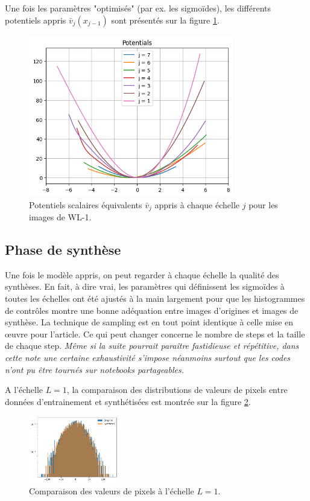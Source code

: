 \documentclass[12pt,twoside]{article}
\begin{document}
Une fois les paramètres "optimisés" (par ex. les sigmoïdes), les différents potentiels appris $\bar{v}_j(x_{j-1})$ sont présentés sur la figure \ref{fig-WL1-potentiels-optim}.

\begin{figure}
\centering
\includegraphics[width=0.8\textwidth]{fig-WL1-potentiels-optim.png}
\caption{Potentiels scalaires équivalents $\bar{v}_j$ appris à chaque échelle $j$ pour les images de WL-1.}
\label{fig-WL1-potentiels-optim}
\end{figure}
%
\subsection{Phase de synthèse}
%
Une fois le modèle appris, on peut regarder à chaque échelle la qualité des synthèses. En fait, à dire vrai, les paramètres qui définissent les sigmoïdes à toutes les échelles ont été ajustés à la main largement pour que les histogrammes de contrôles montre une bonne adéquation entre images d'origines et images de synthèse. La technique de sampling est en tout point identique à celle mise en œuvre pour l'article. Ce qui peut changer concerne le nombre de steps et la taille de chaque step. \textit{Même si la suite pourrait paraître fastidieuse et répétitive, dans cette note une certaine exhaustivité s'impose néanmoins surtout que les codes n'ont pu être tournés sur notebooks partageables.} 

A l'échelle $L=1$, la comparaison des distributions de valeurs de pixels entre données d'entrainement et synthétisées est montrée sur la figure \ref{fig-WL1-synt-L1-pixelval}.
\begin{figure}
\centering
\includegraphics[width=0.35\textwidth]{fig-WL1-synt-L1-pixelval.png}
\caption{Comparaison des valeurs de pixels à l'échelle $L=1$.}
\label{fig-WL1-synt-L1-pixelval}
\end{figure}
\end{document}
